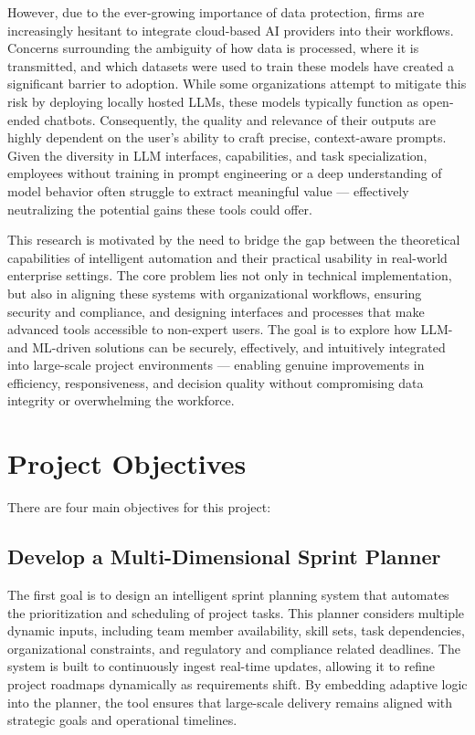\documentclass{report}
\begin{document}
However, due to the ever-growing importance of data protection, firms are increasingly hesitant to integrate cloud-based AI providers into their workflows. Concerns surrounding the ambiguity of how data is processed, where it is transmitted, and which datasets were used to train these models have created a significant barrier to adoption. While some organizations attempt to mitigate this risk by deploying locally hosted LLMs, these models typically function as open-ended chatbots. Consequently, the quality and relevance of their outputs are highly dependent on the user's ability to craft precise, context-aware prompts. Given the diversity in LLM interfaces, capabilities, and task specialization, employees without training in prompt engineering or a deep understanding of model behavior often struggle to extract meaningful value — effectively neutralizing the potential gains these tools could offer.

This research is motivated by the need to bridge the gap between the theoretical capabilities of intelligent automation and their practical usability in real-world enterprise settings. The core problem lies not only in technical implementation, but also in aligning these systems with organizational workflows, ensuring security and compliance, and designing interfaces and processes that make advanced tools accessible to non-expert users. The goal is to explore how LLM- and ML-driven solutions can be securely, effectively, and intuitively integrated into large-scale project environments — enabling genuine improvements in efficiency, responsiveness, and decision quality without compromising data integrity or overwhelming the workforce.


\section{Project Objectives}

There are four main objectives for this project:
\subsection{Develop a Multi-Dimensional Sprint Planner}
The first goal is to design an intelligent sprint planning system that automates the prioritization and scheduling of project tasks. This planner considers multiple dynamic inputs, including team member availability, skill sets, task dependencies, organizational constraints, and regulatory and compliance related deadlines. The system is built to continuously ingest real-time updates, allowing it to refine project roadmaps dynamically as requirements shift. By embedding adaptive logic into the planner, the tool ensures that large-scale delivery remains aligned with strategic goals and operational timelines.
\end{document}
